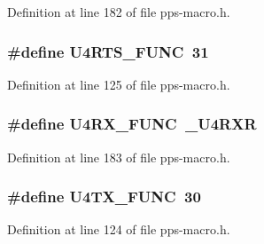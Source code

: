 Definition at line 182 of file pps-\/macro.\+h.

\hypertarget{pps-macro_8h_ae36e3a7ed394d3b751710c56c8e36b24}{}
\subsubsection[{U4\+R\+T\+S\+\_\+\+F\+U\+N\+C}]{\setlength{\rightskip}{0pt plus 5cm}\#define U4\+R\+T\+S\+\_\+\+F\+U\+N\+C~31}\label{pps-macro_8h_ae36e3a7ed394d3b751710c56c8e36b24}


Definition at line 125 of file pps-\/macro.\+h.

\hypertarget{pps-macro_8h_aee668f9d0b6876d22b1322aa049a0856}{}
\subsubsection[{U4\+R\+X\+\_\+\+F\+U\+N\+C}]{\setlength{\rightskip}{0pt plus 5cm}\#define U4\+R\+X\+\_\+\+F\+U\+N\+C~\+\_\+\+U4\+R\+X\+R}\label{pps-macro_8h_aee668f9d0b6876d22b1322aa049a0856}


Definition at line 183 of file pps-\/macro.\+h.

\hypertarget{pps-macro_8h_a9f2a522bfb3bc38e0ac2c79912dc7a09}{}
\subsubsection[{U4\+T\+X\+\_\+\+F\+U\+N\+C}]{\setlength{\rightskip}{0pt plus 5cm}\#define U4\+T\+X\+\_\+\+F\+U\+N\+C~30}\label{pps-macro_8h_a9f2a522bfb3bc38e0ac2c79912dc7a09}


Definition at line 124 of file pps-\/macro.\+h.

